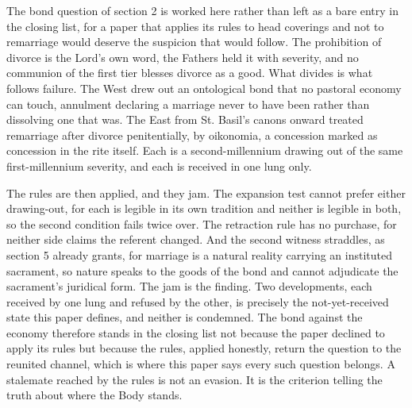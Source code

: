 \documentclass[11pt,twoside]{article}
\newcommand{\unit}[1]{\needspace{3\baselineskip}\par\medskip{\normalfont\bfseries\color{subhead}#1}\par\nobreak\smallskip}
\begin{document}
\unit{Marriage after divorce.}
The bond question of section 2 is worked here rather than left as a bare entry in the closing list, for a paper that applies its rules to head coverings and not to remarriage would deserve the suspicion that would follow. The prohibition of divorce is the Lord's own word, the Fathers held it with severity, and no communion of the first tier blesses divorce as a good. What divides is what follows failure. The West drew out an ontological bond that no pastoral economy can touch, annulment declaring a marriage never to have been rather than dissolving one that was. The East from St. Basil's canons onward treated remarriage after divorce penitentially, by oikonomia, a concession marked as concession in the rite itself. Each is a second-millennium drawing out of the same first-millennium severity, and each is received in one lung only.

The rules are then applied, and they jam. The expansion test cannot prefer either drawing-out, for each is legible in its own tradition and neither is legible in both, so the second condition fails twice over. The retraction rule has no purchase, for neither side claims the referent changed. And the second witness straddles, as section 5 already grants, for marriage is a natural reality carrying an instituted sacrament, so nature speaks to the goods of the bond and cannot adjudicate the sacrament's juridical form. The jam is the finding. Two developments, each received by one lung and refused by the other, is precisely the not-yet-received state this paper defines, and neither is condemned. The bond against the economy therefore stands in the closing list not because the paper declined to apply its rules but because the rules, applied honestly, return the question to the reunited channel, which is where this paper says every such question belongs. A stalemate reached by the rules is not an evasion. It is the criterion telling the truth about where the Body stands.
\end{document}
